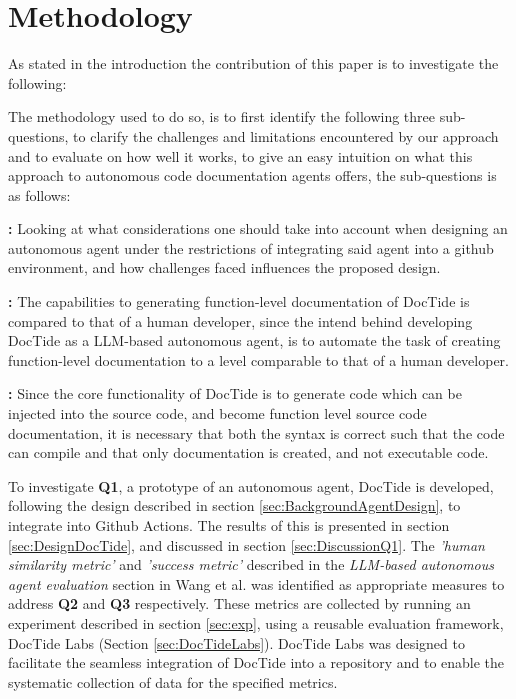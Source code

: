 \newcommand\itemb{\item[\textbf{Q2:}]}
\newcommand\itemc{\item[\textbf{Q3:}]}

\section{Methodology}
\label{sec:method}
As stated in the introduction the contribution of this paper is to investigate the following:
\begin{quote}
    \researchQuestion
\end{quote}
The methodology used to do so, is to first identify the following three sub-questions, to clarify the challenges and limitations encountered by our approach and to evaluate on how well it works, to give an easy intuition on what this approach to autonomous code documentation agents offers, the sub-questions is as follows:

\begin{qlist}
    \item \subquestionI\textbf{:}
    Looking at what considerations one should take into account when designing an autonomous agent under the restrictions of integrating said agent into a github environment, and how challenges faced influences the proposed design.
    \itemb \subquestionII\textbf{:}
    The capabilities to generating function-level documentation of DocTide is compared to that of a human developer, since the intend behind developing DocTide as a LLM-based autonomous agent, is to automate the task of creating function-level documentation to a level comparable to that of a human developer.
    \itemc \subquestionIII\textbf{:}
    Since the core functionality of DocTide is to generate code which can be injected into the source code, and become function level source code documentation, it is necessary that both the syntax is correct such that the code can compile and that only documentation is created, and not executable code.
\end{qlist}


To investigate \textbf{Q1}, a prototype of an autonomous agent, DocTide is developed, following the design described in section \ref{sec:BackgroundAgentDesign}, to integrate into Github Actions. The results of this is presented in section \ref{sec:DesignDocTide}, and discussed in section \ref{sec:DiscussionQ1}. The \textit{'human similarity metric'} and \textit{'success metric'} described in the \textit{LLM-based autonomous agent evaluation} section in Wang et al.\cite{wang2024survey} was identified as appropriate measures to address \textbf{Q2} and \textbf{Q3} respectively. These metrics are collected by running an experiment described in section \ref{sec:exp}, using a reusable evaluation framework, DocTide Labs (Section \ref{sec:DocTideLabs}). DocTide Labs was designed to facilitate the seamless integration of DocTide into a repository and to enable the systematic collection of data for the specified metrics.

